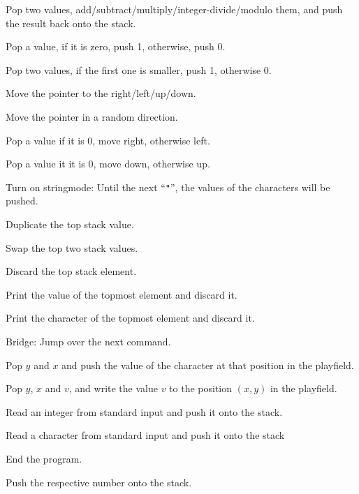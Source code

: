 \begin{description}[labelsep=1em]
    \item[\texttt{+} \texttt{-} \texttt{*} \texttt{/} \texttt{\%}] Pop two values, add/subtract/multiply/integer-divide/modulo them, and push the result back onto the stack.
    \item[\texttt{!}] Pop a value, if it is zero, push 1, otherwise, push 0.
    \item[\texttt{`}] Pop two values, if the first one is smaller, push 1, otherwise 0.
    \item[\texttt{>} \texttt{<} \texttt{\textasciicircum} \texttt{v}] Move the pointer to the right/left/up/down.
    \item[\texttt{?}] Move the pointer in a random direction.
    \item[\texttt{\_}] Pop a value if it is 0, move right, otherwise left.
    \item[\texttt{|}] Pop a value it it is 0, move down, otherwise up.
    \item[\texttt{"}] Turn on stringmode: Until the next “\texttt{"}”, the values of the \ascii{} characters will be pushed.
    \item[\texttt{:}] Duplicate the top stack value.
    \item[\texttt{\textbackslash}] Swap the top two stack values.
    \item[\texttt{\$}] Discard the top stack element.
    \item[\texttt{.}] Print the value of the topmost element and discard it.
    \item[\texttt{,}] Print the \ascii{} character of the topmost element and discard it.
    \item[\texttt{\#}] Bridge: Jump over the next command.
    \item[\texttt{g}] Pop $y$ and $x$ and push the \ascii{} value of the character at that position in the playfield.
    \item[\texttt{p}] Pop $y$, $x$ and $v$, and write the \ascii{} value $v$ to the position $(x,y)$ in the playfield.
    \item[\texttt{\&}] Read an integer from standard input and push it onto the stack.
    \item[\texttt{\~}] Read a character from standard input and push it onto the stack
    \item[\texttt{@}] End the program.
    \item[\texttt{0-9}] Push the respective number onto the stack.
\end{description}

